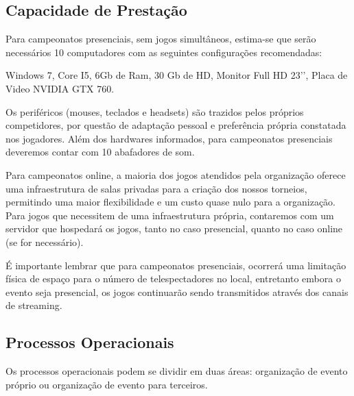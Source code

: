\documentclass[a4paper, 12pt]{paper}
\begin{document}
\subsection{Capacidade de Prestação}
Para campeonatos presenciais, sem jogos simultâneos, estima-se que serão necessários 10 computadores com as seguintes configurações recomendadas:

Windows 7, Core I5,  6Gb de Ram, 30 Gb de HD, Monitor Full HD 23’’, Placa de Video NVIDIA GTX 760.

Os periféricos (mouses, teclados e headsets) são trazidos pelos próprios competidores, por questão de adaptação pessoal e preferência própria constatada nos jogadores. Além dos hardwares informados, para campeonatos presenciais deveremos contar com 10 abafadores de som. 

Para campeonatos online, a maioria dos jogos atendidos pela  organização oferece uma infraestrutura de salas privadas para a criação dos nossos torneios, permitindo uma maior flexibilidade e um custo quase nulo para a organização. Para jogos que necessitem de uma infraestrutura própria, contaremos com um servidor que hospedará os jogos, tanto no caso presencial, quanto no caso online (se for necessário).

É importante lembrar que para campeonatos presenciais, ocorrerá uma limitação física de espaço para o número de telespectadores no local, entretanto embora o evento seja presencial, os jogos continuarão sendo transmitidos através dos canais de streaming.
\subsection{Processos Operacionais}
Os processos operacionais podem se dividir em duas áreas: organização de evento próprio ou organização de evento para terceiros.
\end{document}
